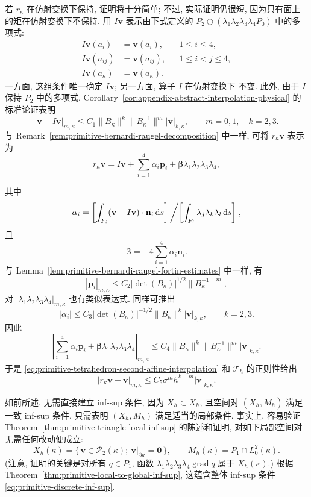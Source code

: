\begin{Proof}
若 $r_\kappa$ 在仿射变换下保持, 证明将十分简单;
不过, 实际证明仍很短, 因为只有面上的矩在仿射变换下不保持.
用 $I\mathbf v$ 表示由下式定义的
$P_2\oplus(\lambda_1\lambda_2\lambda_3\lambda_4P_0)$ 中的多项式:
\[
\begin{aligned}
I\mathbf v(a_i)&=\mathbf v(a_i),&&1\leq i\leq4,\\
I\mathbf v(a_{ij})&=\mathbf v(a_{ij}),&&1\leq i<j\leq4,\\
I\mathbf v(a_\kappa)&=\mathbf v(a_\kappa).
\end{aligned}
\]
一方面, 这组条件唯一确定 $I\mathbf v$; 另一方面, 算子 $I$ 在仿射变换下
不变. 此外, 由于 $I$ 保持 $P_2$ 中的多项式,
Corollary~\ref{cor:appendix-abstract-interpolation-physical} 的标准论证表明
\begin{equation}\label{eq:primitive-tetrahedron-second-affine-interpolation}
|\mathbf v-I\mathbf v|_{m,\kappa}
\leq C_1\|B_\kappa\|^k\|B_\kappa^{-1}\|^m
|\mathbf v|_{k,\kappa},
\qquad m=0,1,\quad k=2,3.
\end{equation}
与 Remark~\ref{rem:primitive-bernardi-raugel-decomposition} 中一样,
可将 $r_\kappa\mathbf v$ 表示为
\[
r_\kappa\mathbf v
=I\mathbf v+\sum_{i=1}^4\alpha_i\mathbf p_i
+\boldsymbol\beta\lambda_1\lambda_2\lambda_3\lambda_4,
\]

其中
\[
\alpha_i=
\left[\int_{F_i}(\mathbf v-I\mathbf v)\cdot\mathbf n_i\,\mathrm ds\right]
\left/\left[\int_{F_i}\lambda_j\lambda_k\lambda_l\,\mathrm ds\right]\right.,
\]
且
\[
\boldsymbol\beta=-4\sum_{i=1}^4\alpha_i\mathbf n_i.
\]
与 Lemma~\ref{lem:primitive-bernardi-raugel-fortin-estimates} 中一样, 有
\[
|\mathbf p_i|_{m,\kappa}
\leq C_2|\det(B_\kappa)|^{1/2}\|B_\kappa^{-1}\|^m,
\]
对 $|\lambda_1\lambda_2\lambda_3\lambda_4|_{m,\kappa}$ 也有类似表达式.
同样可推出
\[
|\alpha_i|
\leq C_3|\det(B_\kappa)|^{-1/2}\|B_\kappa\|^k
|\mathbf v|_{k,\kappa},
\qquad k=2,3.
\]
因此
\[
\left|\sum_{i=1}^4\alpha_i\mathbf p_i
+\boldsymbol\beta\lambda_1\lambda_2\lambda_3\lambda_4\right|_{m,\kappa}
\leq C_4\|B_\kappa\|^k\|B_\kappa^{-1}\|^m
|\mathbf v|_{k,\kappa}.
\]
于是 \eqref{eq:primitive-tetrahedron-second-affine-interpolation} 和
$\mathcal T_h$ 的正则性给出
\[
|r_\kappa\mathbf v-\mathbf v|_{m,\kappa}
\leq C_5\sigma^m h^{k-m}|\mathbf v|_{k,\kappa}.
\]
\end{Proof}

如前所述, 无需直接建立 inf-sup 条件, 因为 $\bar X_h\subset X_h$,
且空间对 $(\bar X_h,\bar M_h)$ 满足一致 inf-sup 条件. 只需表明
$(X_h,M_h)$ 满足适当的局部条件. 事实上, 容易验证
Theorem~\ref{thm:primitive-triangle-local-inf-sup} 的陈述和证明,
对如下局部空间对无需任何改动便成立:
\[
X_h(\kappa)=\{\,\mathbf v\in\mathcal P_2(\kappa);
\ \mathbf v|_{\partial\kappa}=\mathbf0\,\},
\qquad
M_h(\kappa)=P_1\cap L_0^2(\kappa).
\]
(注意, 证明的关键是对所有 $q\in P_1$, 函数
$\lambda_1\lambda_2\lambda_3\lambda_4\operatorname{grad}q$
属于 $X_h(\kappa)$.) 根据
Theorem~\ref{thm:primitive-local-to-global-inf-sup}, 这蕴含整体 inf-sup 条件
\eqref{eq:primitive-discrete-inf-sup}.

